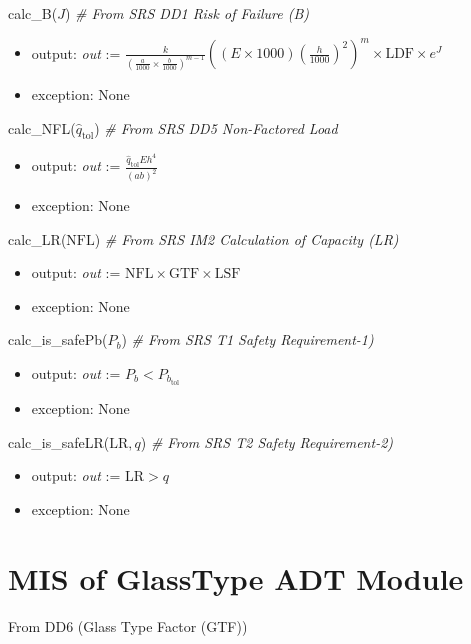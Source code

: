 \documentclass[12pt, titlepage]{article}
\begin{document}
\noindent calc\_B($J$) \textit{\# From SRS DD1 Risk of Failure (B)}
\begin{itemize}
\item output:  \textit{out} := $\frac{k}{(\frac{a}{1000}\times 
				\frac{b}{1000})^{m-1}}((E \times 1000)(\frac{h}{1000})^2)^m 
					\times \text{LDF} \times e^J$
\item exception: None
\end{itemize}

\noindent calc\_NFL($\hat{q}_\text{tol}$) \textit{\# From SRS DD5 Non-Factored Load}
\begin{itemize}
\item output:  \textit{out} := $\frac{\hat{q}_{\text{tol}}Eh^4}{(ab)^2}$
\item exception: None
\end{itemize}

\noindent calc\_LR($\text{NFL}$) \textit{\# From SRS IM2 Calculation of Capacity (LR)}
\begin{itemize}
\item output:  \textit{out} := $\text{NFL} \times \text{GTF} \times \text{LSF}$
\item exception: None
\end{itemize}

\noindent calc\_is\_safePb($P_b$) \textit{\# From SRS T1 Safety Requirement-1)}
\begin{itemize}
\item output:  \textit{out} := $P_b < P_{b_{\text{tol}}}$
\item exception: None
\end{itemize}

\noindent calc\_is\_safeLR($\text{LR}, q$) \textit{\# From SRS T2 Safety Requirement-2)}
\begin{itemize}
\item output:  \textit{out} := $\text{LR} > q$
\item exception: None
\end{itemize}

\newpage


\section {MIS of GlassType ADT Module} \label{GlassTypeADT}

From DD6 (Glass Type Factor (GTF)) %
\end{document}
